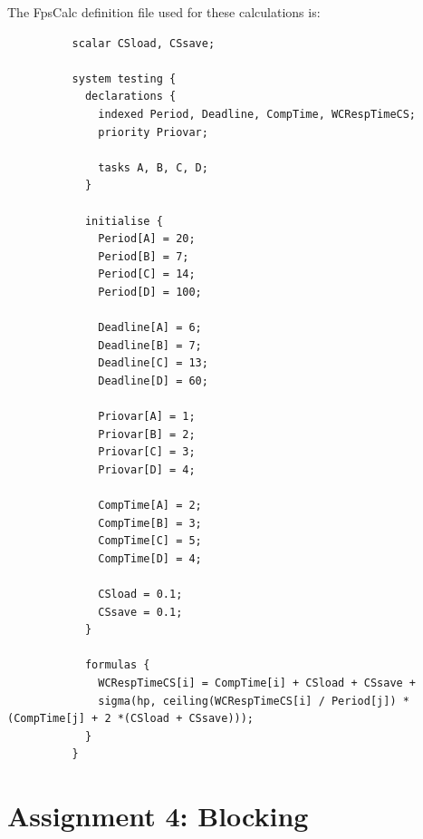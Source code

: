 \documentclass[a4paper,10pt]{article}
\begin{document}
\begin{enumerate}
        The FpsCalc definition file used for these calculations is:

        \begin{lstlisting}
          scalar CSload, CSsave;
          
          system testing {
            declarations {		
              indexed Period, Deadline, CompTime, WCRespTimeCS;
              priority Priovar;	
              
              tasks A, B, C, D;
            }
            
            initialise {
              Period[A] = 20;
              Period[B] = 7;
              Period[C] = 14;
              Period[D] = 100;
              
              Deadline[A] = 6;
              Deadline[B] = 7;
              Deadline[C] = 13;
              Deadline[D] = 60;
              
              Priovar[A] = 1;
              Priovar[B] = 2;
              Priovar[C] = 3;
              Priovar[D] = 4;
              
              CompTime[A] = 2;
              CompTime[B] = 3;
              CompTime[C] = 5;
              CompTime[D] = 4;
              
              CSload = 0.1;
              CSsave = 0.1;
            }
            
            formulas {
              WCRespTimeCS[i] = CompTime[i] + CSload + CSsave + 
              sigma(hp, ceiling(WCRespTimeCS[i] / Period[j]) * (CompTime[j] + 2 *(CSload + CSsave))); 
            }
          }
        \end{lstlisting}
	
\end{enumerate}

\section{Assignment 4: Blocking}
\end{document}
